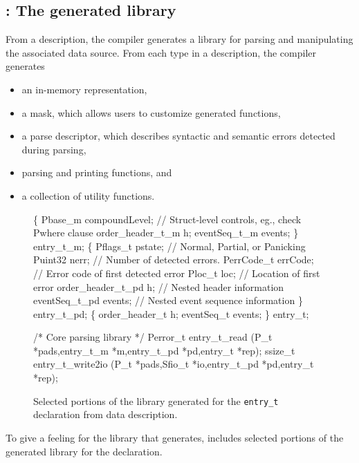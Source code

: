 \subsection{\pads{}: The generated library}
From a description, the \pads{} compiler generates a \C{} library
for parsing and manipulating the associated data source.  
From each type in a \pads{} description, the compiler generates 
\begin{itemize}
\setlength{\itemsep}{0ex plus0.2ex}
\item an in-memory representation, 
\item a mask, which allows users to customize generated functions,
\item a parse descriptor, which describes syntactic and
semantic errors detected during parsing, 
\item parsing and printing functions, and 
\item a collection of utility functions.
\end{itemize}
%
\setcounter{totalnumber}{1}
\setcounter{dbltopnumber}{1}
\renewcommand{\topfraction}{0.85}
\renewcommand{\textfraction}{0.1}
\renewcommand{\floatpagefraction}{0.75}
\begin{figure*}
\begin{tiny}
\begin{code}
  \{
  Pbase\_m compoundLevel;   // Struct-level controls, eg., check Pwhere clause
  order\_header\_t\_m h;
  eventSeq\_t\_m events;
\} entry\_t\_m;
\mbox{}
  \{
  Pflags\_t pstate;         // Normal, Partial, or Panicking 
  Puint32 nerr;            // Number of detected errors.
  PerrCode\_t errCode;      // Error code of first detected error
  Ploc\_t loc;              // Location of first error
  order\_header\_t\_pd h;     // Nested header information
  eventSeq\_t\_pd events;    // Nested event sequence information
\} entry\_t\_pd;
\mbox{}
  \{
  order\_header\_t h;
  eventSeq\_t events;
\} entry\_t;
\end{code}
\begin{code}
/* Core parsing library */
Perror\_t entry\_t\_read (P\_t *pads,entry\_t\_m *m,entry\_t\_pd *pd,entry\_t *rep);
ssize\_t entry\_t\_write2io (P\_t *pads,Sfio\_t *io,entry\_t\_pd *pd,entry\_t *rep);
\end{code}
\caption{Selected portions of the library generated for the \texttt{entry\_t}
  declaration from \dibbler{} data description.}
\label{figure:library}
\end{tiny}
\end{figure*}
To give a feeling for the library that \pads{} generates, 
 includes selected portions of the generated 
library for the \dibbler{}  declaration.


